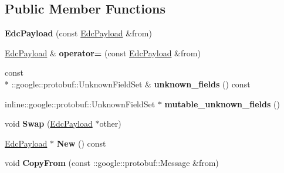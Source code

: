 \subsection*{Public Member Functions}
\begin{DoxyCompactItemize}
\item 
\hypertarget{classedcdatatypes_1_1_edc_payload_a260961cac4b3a6f67cfc17ba06e9487b}{{\bfseries Edc\-Payload} (const \hyperlink{classedcdatatypes_1_1_edc_payload}{Edc\-Payload} \&from)}\label{classedcdatatypes_1_1_edc_payload_a260961cac4b3a6f67cfc17ba06e9487b}

\item 
\hypertarget{classedcdatatypes_1_1_edc_payload_ac68544e4f0eeb8534c81f9672df750b9}{\hyperlink{classedcdatatypes_1_1_edc_payload}{Edc\-Payload} \& {\bfseries operator=} (const \hyperlink{classedcdatatypes_1_1_edc_payload}{Edc\-Payload} \&from)}\label{classedcdatatypes_1_1_edc_payload_ac68544e4f0eeb8534c81f9672df750b9}

\item 
\hypertarget{classedcdatatypes_1_1_edc_payload_a3b6a5746fdccb909603411a30d301d50}{const \\*
\-::google\-::protobuf\-::\-Unknown\-Field\-Set \& {\bfseries unknown\-\_\-fields} () const }\label{classedcdatatypes_1_1_edc_payload_a3b6a5746fdccb909603411a30d301d50}

\item 
\hypertarget{classedcdatatypes_1_1_edc_payload_ad2b33c7cccf73b829593f8e8612ca9be}{inline\-::google\-::protobuf\-::\-Unknown\-Field\-Set $\ast$ {\bfseries mutable\-\_\-unknown\-\_\-fields} ()}\label{classedcdatatypes_1_1_edc_payload_ad2b33c7cccf73b829593f8e8612ca9be}

\item 
\hypertarget{classedcdatatypes_1_1_edc_payload_a3e93de268f296e389d4c4ffd77033d30}{void {\bfseries Swap} (\hyperlink{classedcdatatypes_1_1_edc_payload}{Edc\-Payload} $\ast$other)}\label{classedcdatatypes_1_1_edc_payload_a3e93de268f296e389d4c4ffd77033d30}

\item 
\hypertarget{classedcdatatypes_1_1_edc_payload_a751740f6378c6ac62155b0e74a09a9ae}{\hyperlink{classedcdatatypes_1_1_edc_payload}{Edc\-Payload} $\ast$ {\bfseries New} () const }\label{classedcdatatypes_1_1_edc_payload_a751740f6378c6ac62155b0e74a09a9ae}

\item 
\hypertarget{classedcdatatypes_1_1_edc_payload_aa64f5466859f94c89f9f240d791def85}{void {\bfseries Copy\-From} (const \-::google\-::protobuf\-::\-Message \&from)}\label{classedcdatatypes_1_1_edc_payload_aa64f5466859f94c89f9f240d791def85}


\end{DoxyCompactItemize}

